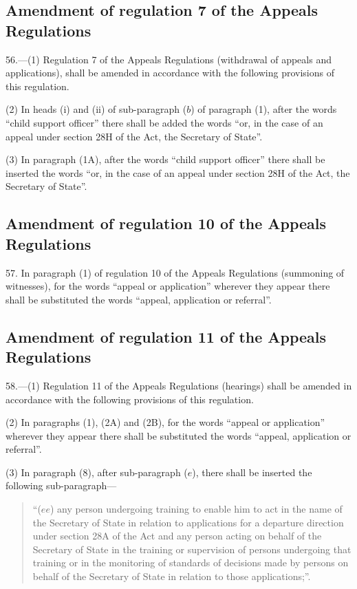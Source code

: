 \documentclass[a4paper]{article}
\begin{document}
\subsection[56. Amendment of regulation 7 of the Appeals Regulations]{Amendment of regulation 7 of the Appeals Regulations}

56.—(1) Regulation 7 of the
Appeals Regulations (withdrawal of appeals and applications), shall be amended
in accordance with the following provisions of this regulation.

(2) In heads (i) and (ii) of sub-paragraph ($b$) of paragraph (1), after the words
“child support officer” there shall be added the words “or, in the case of an
appeal under section 28H of the Act, the Secretary of State”.

(3) In paragraph (1A), after the words “child support officer” there shall be
inserted the words “or, in the case of an appeal under section 28H of the Act,
the Secretary of State”.

\subsection[57. Amendment of regulation 10 of the Appeals Regulations]{Amendment of regulation 10 of the Appeals Regulations}

57. In paragraph (1) of
regulation 10 of the Appeals Regulations (summoning of witnesses), for the words
“appeal or application” wherever they appear there shall be substituted the
words “appeal, application or referral”.

\subsection[58. Amendment of regulation 11 of the Appeals Regulations]{Amendment of regulation 11 of the Appeals Regulations}

58.—(1) Regulation 11 of
the Appeals Regulations (hearings) shall be amended in accordance with the
following provisions of this regulation.

(2) In paragraphs (1), (2A) and (2B), for the words “appeal or application”
wherever they appear there shall be substituted the words “appeal, application
or referral”.

(3) In paragraph (8), after sub-paragraph ($e$), there shall be inserted the
following sub-paragraph—
\begin{quotation}
“($ee$) any person undergoing training to enable him to act in the name of the
Secretary of State in relation to applications for a departure direction under
section 28A of the Act and any person acting on behalf of the Secretary of State
in the training or supervision of persons undergoing that training or in the
monitoring of standards of decisions made by persons on behalf of the Secretary
of State in relation to those applications;”.
\end{quotation}
\end{document}
